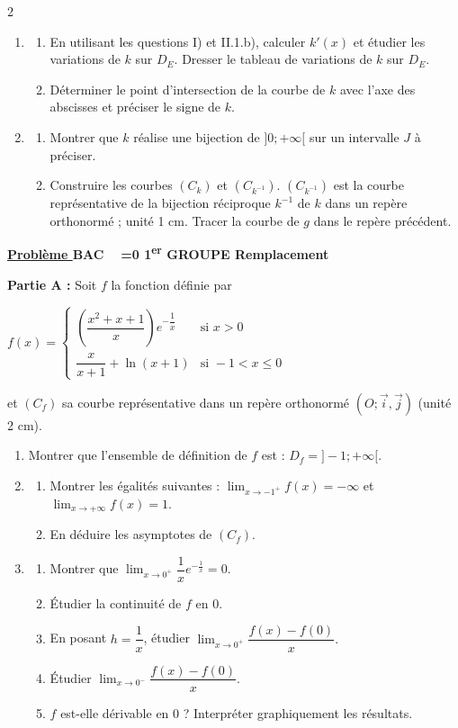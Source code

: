 \documentclass[12pt,a4paper]{article}
\newcounter{probleme}
\newcounter{annee}
\newcounter{session}
\newcommand{\exo}{%
    \refstepcounter{probleme}%
    \par\medskip
    \noindent\textbf{\underline{Problème \theprobleme}\quad
    BAC \theannee\ %
    \ifnum\value{session}=0
        1\textsuperscript{er} GROUPE%
        \setcounter{session}{1}%
    \else
        Remplacement%
        \setcounter{session}{0}%
        \stepcounter{annee}%
    \fi
    }
    \par\medskip
}
\begin{document}
\begin{multicols}{2}
\begin{enumerate}
\item 
\begin{enumerate}
\item En utilisant les questions I) et II.1.b), calculer \( k'(x) \) et étudier les variations de $k$ sur $D_E$.  
Dresser le tableau de variations de $k$ sur $D_E$.
\item Déterminer le point d’intersection de la courbe de $k$ avec l’axe des abscisses et préciser le signe de $k$.
\end{enumerate}

\item 
\begin{enumerate}
\item Montrer que $k$ réalise une bijection de $]0;+\infty[$ sur un intervalle $J$ à préciser.
\item Construire les courbes $(C_k)$ et $(C_{k^{-1}})$.  
$(C_{k^{-1}})$ est la courbe représentative de la bijection réciproque $k^{-1}$ de $k$ dans un repère orthonormé ; unité 1 cm.  
Tracer la courbe de $g$ dans le repère précédent.
\end{enumerate}
\end{enumerate}
\exo

\textbf{Partie A :} Soit $f$ la fonction définie par

\(
f(x)=
\begin{cases}
\left( \dfrac{x^2+x+1}{x}\right) e^{-\dfrac{1}{x}} & \text{si } x>0 \\[0.3cm]
\dfrac{x}{x+1}+\ln(x+1) & \text{si } -1<x\leq 0
\end{cases}
\)

et $(C_f)$ sa courbe représentative dans un repère orthonormé $(O;\vec{i},\vec{j})$ (unité 2 cm).

\begin{enumerate}
\item Montrer que l’ensemble de définition de $f$ est :  
\( D_f=]-1;+\infty[. \)

\item 
\begin{enumerate}
\item Montrer les égalités suivantes :  
\( \lim_{x\to -1^+} f(x)=-\infty \) et \( \lim_{x\to +\infty} f(x)=1. \)
\item En déduire les asymptotes de $(C_f)$.
\end{enumerate}

\item 
\begin{enumerate}
\item Montrer que \( \lim_{x\to 0^+} \dfrac{1}{x}e^{-\frac{1}{x}}=0. \)
\item Étudier la continuité de $f$ en $0$.
\item En posant \( h=\dfrac{1}{x} \), étudier  
\( \lim_{x\to 0^+} \dfrac{f(x)-f(0)}{x}. \)
\item Étudier \( \lim_{x\to 0^-} \dfrac{f(x)-f(0)}{x}. \)
\item $f$ est-elle dérivable en $0$ ? Interpréter graphiquement les résultats.
\end{enumerate}


\end{enumerate}
\end{multicols}
\end{document}
